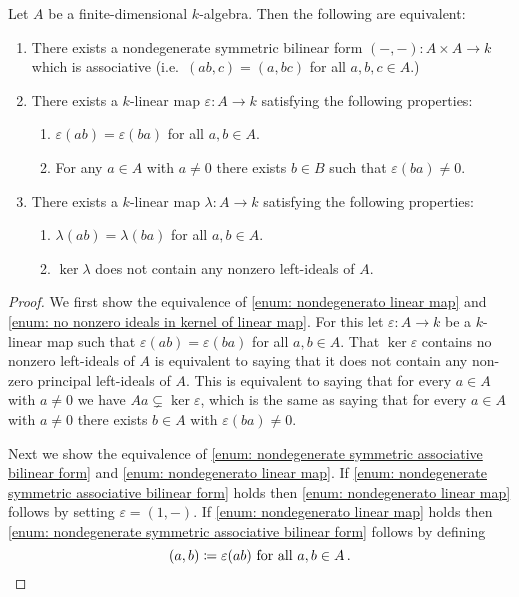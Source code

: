 \begin{prop}
  Let $A$ be a finite-dimensional $k$-algebra.
  Then the following are equivalent:
  \begin{enumerate}[label=\emph{\roman*)},leftmargin=*]
    \item \label{enum: nondegenerate symmetric associative bilinear form}
      There exists a nondegenerate symmetric bilinear form $(-,-) \colon A \times A \to k$ which is associative (i.e.\ $(ab,c) = (a,bc)$ for all $a,b,c \in A$.)
    \item \label{enum: nondegenerato linear map}
      There exists a $k$-linear map $\varepsilon \colon A \to k$ satisfying the following properties:
      \begin{enumerate}[label=\emph{(\roman*)},leftmargin=*]
        \item
          $\varepsilon(ab) = \varepsilon(ba)$ for all $a,b \in A$.
        \item
          For any $a \in A$ with $a \neq 0$ there exists $b \in B$ such that $\varepsilon(ba) \neq 0$.
      \end{enumerate}
    \item \label{enum: no nonzero ideals in kernel of linear map}
      There exists a $k$-linear map $\lambda \colon A \to k$ satisfying the following properties:
      \begin{enumerate}[label=\emph{(\roman*)},leftmargin=*]
        \item
          $\lambda(ab) = \lambda(ba)$ for all $a,b \in A$.
        \item
          $\ker \lambda$ does not contain any nonzero left-ideals of $A$.
      \end{enumerate}
  \end{enumerate}
\end{prop}
\begin{proof}
  We first show the equivalence of \ref{enum: nondegenerato linear map} and \ref{enum: no nonzero ideals in kernel of linear map}.
  For this let $\varepsilon \colon A \to k$ be a $k$-linear map such that $\varepsilon(ab) = \varepsilon(ba)$ for all $a,b \in A$.
  That $\ker \varepsilon$ contains no nonzero left-ideals of $A$ is equivalent to saying that it does not contain any non-zero principal left-ideals of $A$.
  This is equivalent to saying that for every $a \in A$ with $a \neq 0$ we have $Aa \subsetneq \ker \varepsilon$, which is the same as saying that for every $a \in A$ with $a \neq 0$ there exists $b \in A$ with $\varepsilon(ba) \neq 0$.
  
  Next we show the equivalence of \ref{enum: nondegenerate symmetric associative bilinear form} and \ref{enum: nondegenerato linear map}.
  If \ref{enum: nondegenerate symmetric associative bilinear form} holds then \ref{enum: nondegenerato linear map} follows by setting $\varepsilon = (1,-)$.
  If \ref{enum: nondegenerato linear map} holds then \ref{enum: nondegenerate symmetric associative bilinear form} follows by defining
  \[
              (a,b)
    \coloneqq \varepsilon(ab)
    \text{ for all }
    a, b \in A \,.
    \qedhere
  \]
\end{proof}


